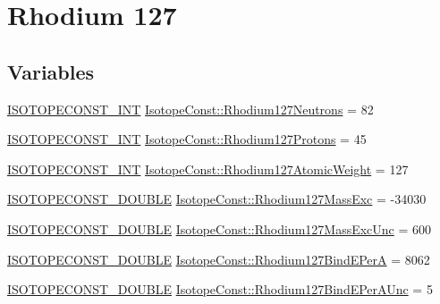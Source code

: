\hypertarget{group___isotope_const-_rhodium-_rh127}{}\section{Rhodium 127}
\label{group___isotope_const-_rhodium-_rh127}
\subsection*{Variables}
\begin{DoxyCompactItemize}
\item 
\mbox{\hyperlink{group___isotope_const-_macros_ga5f18360b3e99483a35c32d789e62621c}{I\+S\+O\+T\+O\+P\+E\+C\+O\+N\+S\+T\+\_\+\+I\+NT}} \mbox{\hyperlink{group___isotope_const-_rhodium-_rh127_ga86aad139a94837f24d85c398ad8f9eab}{Isotope\+Const\+::\+Rhodium127\+Neutrons}} = 82
\item 
\mbox{\hyperlink{group___isotope_const-_macros_ga5f18360b3e99483a35c32d789e62621c}{I\+S\+O\+T\+O\+P\+E\+C\+O\+N\+S\+T\+\_\+\+I\+NT}} \mbox{\hyperlink{group___isotope_const-_rhodium-_rh127_ga062f4cedd7715acb5d6091ad22984e5d}{Isotope\+Const\+::\+Rhodium127\+Protons}} = 45
\item 
\mbox{\hyperlink{group___isotope_const-_macros_ga5f18360b3e99483a35c32d789e62621c}{I\+S\+O\+T\+O\+P\+E\+C\+O\+N\+S\+T\+\_\+\+I\+NT}} \mbox{\hyperlink{group___isotope_const-_rhodium-_rh127_ga9309c2eec67401cfbd3e9166f7a1125f}{Isotope\+Const\+::\+Rhodium127\+Atomic\+Weight}} = 127
\item 
\mbox{\hyperlink{group___isotope_const-_macros_ga8f45a7272ce02c0b4c65c44636ed719a}{I\+S\+O\+T\+O\+P\+E\+C\+O\+N\+S\+T\+\_\+\+D\+O\+U\+B\+LE}} \mbox{\hyperlink{group___isotope_const-_rhodium-_rh127_gaf0fe830e146e3cf31eeb83f694d04342}{Isotope\+Const\+::\+Rhodium127\+Mass\+Exc}} = -\/34030
\item 
\mbox{\hyperlink{group___isotope_const-_macros_ga8f45a7272ce02c0b4c65c44636ed719a}{I\+S\+O\+T\+O\+P\+E\+C\+O\+N\+S\+T\+\_\+\+D\+O\+U\+B\+LE}} \mbox{\hyperlink{group___isotope_const-_rhodium-_rh127_gaeac326e81365345c725560a26212801b}{Isotope\+Const\+::\+Rhodium127\+Mass\+Exc\+Unc}} = 600
\item 
\mbox{\hyperlink{group___isotope_const-_macros_ga8f45a7272ce02c0b4c65c44636ed719a}{I\+S\+O\+T\+O\+P\+E\+C\+O\+N\+S\+T\+\_\+\+D\+O\+U\+B\+LE}} \mbox{\hyperlink{group___isotope_const-_rhodium-_rh127_gabd158875c72a47ea8f563fd0fffaab51}{Isotope\+Const\+::\+Rhodium127\+Bind\+E\+PerA}} = 8062
\item 
\mbox{\hyperlink{group___isotope_const-_macros_ga8f45a7272ce02c0b4c65c44636ed719a}{I\+S\+O\+T\+O\+P\+E\+C\+O\+N\+S\+T\+\_\+\+D\+O\+U\+B\+LE}} \mbox{\hyperlink{group___isotope_const-_rhodium-_rh127_gafbef107669e2116a234f469b1490f0cf}{Isotope\+Const\+::\+Rhodium127\+Bind\+E\+Per\+A\+Unc}} = 5

\end{DoxyCompactItemize}
